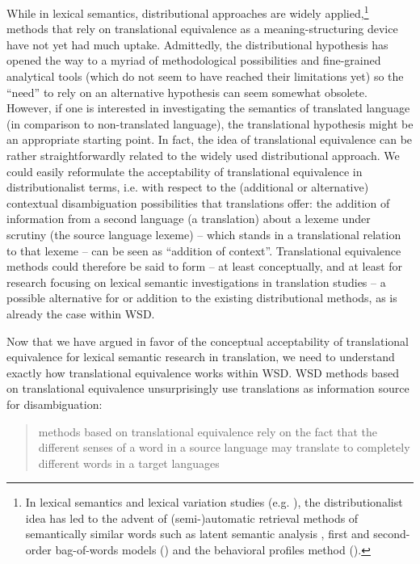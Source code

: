 While in lexical semantics, distributional approaches are widely applied,\footnote{In lexical semantics and lexical variation studies (e.g. \citealt{peirsman_automatic_2010}), the distributionalist idea has led to the advent of (semi-)automatic retrieval methods of semantically similar words such as latent semantic analysis \citep{landauer_solution_1997}, first and second-order bag-of-words models (\citealt{manning_foundations_1999}) and the behavioral profiles method (\citealt{divjak_ways_2006, evans_behavioral_2009}).} methods that rely on translational equivalence as a meaning-structuring device have not yet had much uptake. Admittedly, the distributional hypothesis has opened the way to a myriad of methodological possibilities and fine-grained analytical tools (which do not seem to have reached their limitations yet) so the ``need'' to rely on an alternative hypothesis can seem somewhat obsolete. However, if one is interested in investigating the semantics of translated language (in comparison to non-translated language), the translational hypothesis might be an appropriate starting point. In fact, the idea of translational equivalence can be rather straightforwardly related to the widely used distributional approach. We could easily reformulate the acceptability of translational equivalence in distributionalist terms, i.e. with respect to the (additional or alternative) contextual disambiguation possibilities that translations offer: the addition of information from a second language (a translation) about a lexeme under scrutiny (the source language lexeme) – which stands in a translational relation to that lexeme – can be seen as ``addition of context''. Translational equivalence methods could therefore be said to form – at least conceptually, and at least for research focusing on lexical semantic investigations in translation studies – a possible alternative for or addition to the existing distributional methods, as is already the case within WSD.

Now that we have argued in favor of the conceptual acceptability of translational equivalence for lexical semantic research in translation, we need to understand exactly how translational equivalence works within WSD. WSD methods based on translational equivalence unsurprisingly use translations as information source for disambiguation:

\begin{quote}
methods based on translational equivalence rely on the fact that the different senses of a word in a source language may translate to completely different words in a target languages \citep[134]{agirre_unsupervised_2007}
\end{quote}

